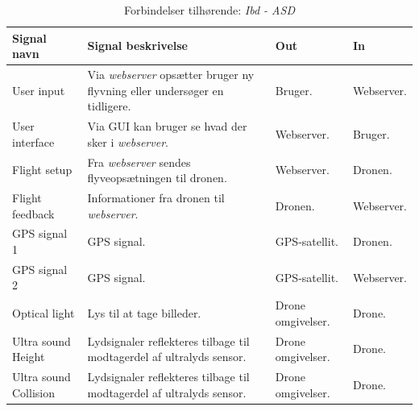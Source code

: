\begin{table}[H]
	\centering
		\begin{tabular}{|p{2.6 cm}|p{}|p{2,2 cm}|p{}|} 
		\hline
			\textbf{Signal navn} 	& \textbf{Signal beskrivelse}		& \textbf{Out} 				& \textbf{In}     \\ \hline
			User input 			& Via \textit{webserver} opsætter bruger ny flyvning eller undersøger en tidligere. & Bruger. 		& Webserver.			    \\ \hline
			User interface 		& Via GUI kan bruger se \newline hvad der sker i \textit{webserver}.	& Webserver.			& Bruger.				\\ \hline
			Flight setup		& Fra \textit{webserver} sendes \newline flyveopsætningen til dronen.	& Webserver.	& Dronen.	\\ \hline
			Flight feedback		& Informationer fra \newline dronen til \textit{webserver}.	& 	Dronen.		& Webserver.			    \\ \hline
			GPS signal 1		& GPS signal.	& GPS-satellit.			& Dronen.				\\ \hline
			GPS signal 2		& GPS signal.	& GPS-satellit.				& Webserver.	\\ \hline  
			Optical light		& Lys til at tage billeder.	& Drone \newline omgivelser.				& Drone.	\\ \hline 
			Ultra sound \newline Height		& Lydsignaler reflekteres tilbage \newline til modtagerdel af ultralyds sensor.	& Drone \newline omgivelser.				& Drone.	\\ \hline 
			Ultra sound \newline Collision		& Lydsignaler reflekteres tilbage \newline til modtagerdel af ultralyds sensor.	& Drone \newline omgivelser.				& Drone.	\\ \hline 
		\end{tabular}
	\caption{Forbindelser tilhørende: \textit{Ibd - ASD}}
	\label{tab:IBD1}
\end{table}


